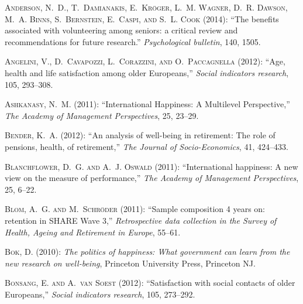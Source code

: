 \documentclass[10pt, letterpaper]{article}
\begin{document}
\begin{spacing}{1.4}
\begin{thebibliography}{71}
\textsc{Anderson, N.~D., T.~Damianakis, E.~Kr{\"o}ger, L.~M. Wagner, D.~R.
  Dawson, M.~A. Binns, S.~Bernstein, E.~Caspi, and S.~L. Cook} (2014):
  \enquote{The benefits associated with volunteering among seniors: a critical
  review and recommendations for future research.} \emph{Psychological
  bulletin}, 140, 1505.

\textsc{Angelini, V., D.~Cavapozzi, L.~Corazzini, and O.~Paccagnella} (2012):
  \enquote{Age, health and life satisfaction among older Europeans,}
  \emph{Social indicators research}, 105, 293--308.

\textsc{Ashkanasy, N.~M.} (2011): \enquote{International Happiness: A
  Multilevel Perspective,} \emph{The Academy of Management Perspectives}, 25,
  23--29.

\textsc{Bender, K.~A.} (2012): \enquote{An analysis of well-being in
  retirement: The role of pensions, health, of retirement,} \emph{The Journal
  of Socio-Economics}, 41, 424--433.

\textsc{Blanchflower, D.~G. and A.~J. Oswald} (2011): \enquote{International
  happiness: A new view on the measure of performance,} \emph{The Academy of
  Management Perspectives}, 25, 6--22.

\textsc{Blom, A.~G. and M.~Schr{\"o}der} (2011): \enquote{Sample composition 4
  years on: retention in SHARE Wave 3,} \emph{Retrospective data collection in
  the Survey of Health, Ageing and Retirement in Europe}, 55--61.

\textsc{Bok, D.} (2010): \emph{The politics of happiness: What government can
  learn from the new research on well-being}, Princeton University Press,
  Princeton NJ.

\textsc{Bonsang, E. and A.~van Soest} (2012): \enquote{Satisfaction with social
  contacts of older Europeans,} \emph{Social indicators research}, 105,
  273--292.


\end{thebibliography}
\end{spacing}
\end{document}
